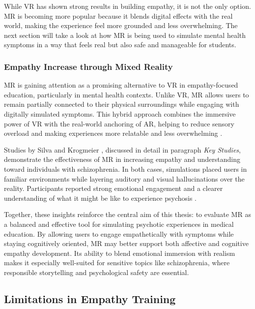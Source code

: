\vspace{1em}

While VR has shown strong results in building empathy, it is not the only option. MR is becoming more popular because it blends digital effects with the real world, making the experience feel more grounded and less overwhelming. The next section will take a look at how MR is being used to simulate mental health symptoms in a way that feels real but also safe and manageable for students.

\subsubsection{Empathy Increase through Mixed Reality}

MR is gaining attention as a promising alternative to VR in empathy-focused education, particularly in mental health contexts. Unlike VR, MR allows users to remain partially connected to their physical surroundings while engaging with digitally simulated symptoms. This hybrid approach combines the immersive power of VR with the real-world anchoring of AR, helping to reduce sensory overload and making experiences more relatable and less overwhelming \cite{Zare-Bidaki2022}.

Studies by Silva \cite{Silva2017} and Krogmeier \cite{Krogmeier2024}, discussed in detail in paragraph \textit{Key Studies}, demonstrate the effectiveness of MR in increasing empathy and understanding toward individuals with schizophrenia. In both cases, simulations placed users in familiar environments while layering auditory and visual hallucinations over the reality. Participants reported strong emotional engagement and a clearer understanding of what it might be like to experience psychosis \cite{Silva2017, Krogmeier2024}. 

\vspace{1em}

Together, these insights reinforce the central aim of this thesis: to evaluate MR as a balanced and effective tool for simulating psychotic experiences in medical education. By allowing users to engage empathetically with symptoms while staying cognitively oriented, MR may better support both affective and cognitive empathy development. Its ability to blend emotional immersion with realism makes it especially well-suited for sensitive topics like schizophrenia, where responsible storytelling and psychological safety are essential.

\subsection{Limitations in Empathy Training}
\label{sec:limitationsempathytraining}

